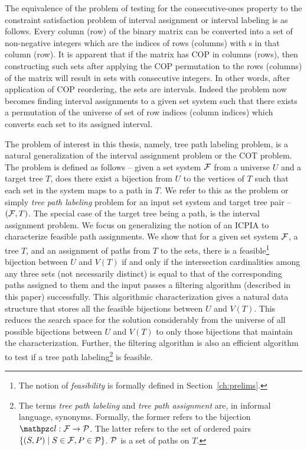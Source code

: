 The equivalence of the problem of testing for the consecutive-ones
property to the constraint satisfaction problem of interval
assignment \cite{nsnrs09} or interval labeling \cite{kklv10} is as
follows. Every column (row) of the binary matrix can be converted into
a set of non-negative integers which are the indices of rows (columns)
with {\un}s in that column (row). It is apparent that if the matrix
has COP in columns (rows), then constructing such sets after applying
the COP permutation to the rows (columns) of the matrix will result in
sets with consecutive integers. In other words, after application of
COP reordering, the sets are intervals. Indeed the problem now becomes
finding interval assignments to a given set system such that there
exists a permutation of the universe of set of row indices (column
indices) which converts each set to its assigned interval.

The problem of interest in this thesis, namely, tree path labeling
problem, is a natural generalization of the interval assignment
problem or the COT problem. The problem is defined as follows -- given
a set system ${\cal F}$ from a universe $U$ and a target tree $T$, does
there exist a bijection from $U$ to the vertices of $T$ such that each
set in the system maps to a path in $T$.  We refer to this as the
{\CFTPL} problem or simply {\em tree path labeling} problem for an
input set system and target tree pair -- $({\cal F},T)$. The special case
of the target tree being a path, is the interval assignment problem.
We focus on generalizing the notion of an ICPIA \cite{nsnrs09} to
characterize feasible path assignments.  We show that for a given set
system ${\cal F}$, a tree $T$, and an assignment of paths from $T$ to the
sets, there is a feasible\footnote{The notion of {\em feasibility} is
  formally defined in Section~\ref{ch:prelims}.}  bijection between
$U$ and $V(T)$ if and only if the intersection cardinalities among any
three sets (not necessarily distinct) is equal to that of the
corresponding paths assigned to them and the input passes a filtering
algorithm (described in this paper) successfully.  This algorithmic
characterization gives a natural data structure that stores all the
feasible bijections between $U$ and $V(T)$. This reduces the search
space for the solution considerably from the universe of all possible
bijections between $U$ and $V(T)$ to only those bijections that
maintain the characterization.  Further, the filtering algorithm is
also an efficient algorithm to test if a tree path
labeling\footnote{The terms {\em tree path labeling} and {\em tree
    path assignment} are, in informal language, synonyms. Formally,
  the former refers to the bijection $\cl: \cF \rightarrow \cP$. The
  latter refers to the set of ordered pairs $\{(S, P) \mid S \in {\cal F},
  P \in {\cal P}\}$. ${\cal P}$ is a set of paths on $T$.} is feasible.


